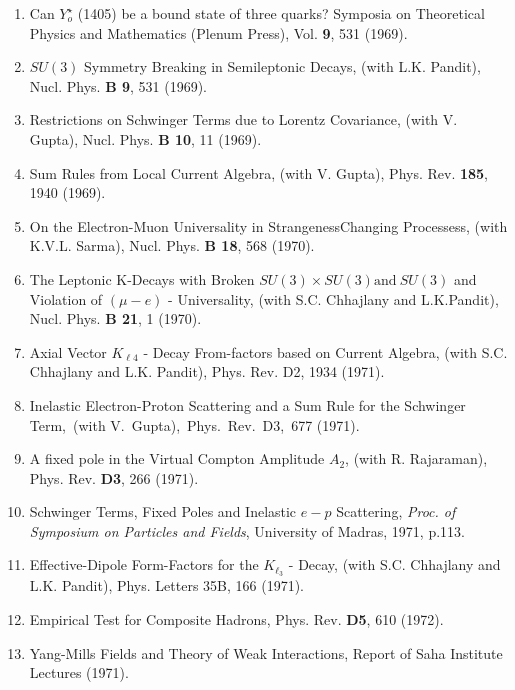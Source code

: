 \begin{enumerate}
\item Can $Y^\star_o$ (1405) be a bound state of three quarks? Symposia
on Theoretical Physics and Mathematics (Plenum Press), Vol. {\bf 9}, 531
(1969).

\item $SU(3)$ Symmetry Breaking in Semileptonic Decays, (with L.K.
Pandit), Nucl. Phys. {\bf B 9}, 531 (1969).

\item Restrictions on Schwinger Terms due to Lorentz Covariance, (with
V. Gupta), Nucl. Phys. {\bf B 10}, 11 (1969).

\item Sum Rules from Local Current Algebra, (with V. Gupta), Phys. Rev.
{\bf 185}, 1940 (1969).

\item On the Electron-Muon Universality in Strangeness\break Changing
Processess, (with K.V.L. Sarma), Nucl. Phys. {\bf B 18}, 568 (1970).

\item The Leptonic K-Decays with Broken $SU(3) \times SU(3) \mbox{and}
\ SU(3)$ and Violation of $(\mu - e)$ - Universality, (with S.C. Chhajlany
and L.K.Pandit), Nucl. Phys. {\bf B 21}, 1 (1970).

\item Axial Vector $K_{\ell 4}$ - Decay From-factors based on Current
Algebra, (with S.C. Chhajlany and L.K. Pandit), Phys. Rev. D2, 1934
(1971).

\item Inelastic Electron-Proton Scattering and a Sum Rule for the
Schwinger Term,\ (with V.\ Gupta),\ Phys.\ Rev.\ D3,\ 677 (1971).

\item A fixed pole in the Virtual Compton Amplitude $A_2$, (with R.
Rajaraman), Phys. Rev. {\bf D3}, 266 (1971).

\item Schwinger Terms, Fixed Poles and Inelastic $e-p$ Scattering, {\it Proc.
of Symposium on Particles and Fields}, University of Madras, 1971, p.113.

\item Effective-Dipole Form-Factors for the $K_{\ell_3}$ - Decay, (with
S.C. Chhajlany and L.K. Pandit), Phys. Letters 35B, 166 (1971).

\item Empirical Test for Composite Hadrons, Phys. Rev. {\bf D5}, 610
(1972).

\item Yang-Mills Fields and Theory of Weak Interactions, Report of Saha
Institute Lectures (1971).


\end{enumerate}
